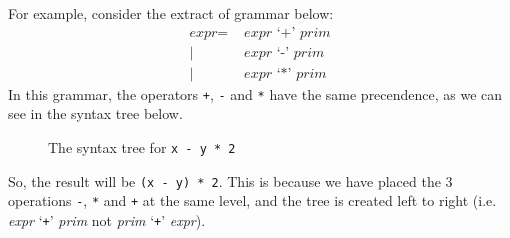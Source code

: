 \documentclass[a4paper, openany]{memoir}
\begin{document}
For example, consider the extract of grammar below:
\begin{align*}
    \textit{expr} =&  \textit{ expr} \text{ `}\texttt{+}\text{' } \textit{prim} \\
    |\hspace{2pt} & \textit{ expr} \text{ `}\texttt{-}\text{' } \textit{prim} \\
    |\hspace{2pt} & \textit{ expr} \text{ `}\texttt{*}\text{' } \textit{prim}
\end{align*}
\noindent In this grammar, the operators \texttt{+}, \texttt{-} and \texttt{*} have the same precendence, as we can see in the syntax tree below.
\begin{figure}[H]
    \centering
    \caption{The syntax tree for \texttt{x - y * 2}}
\end{figure}
\noindent So, the result will be \texttt{(x - y) * 2}. This is because we have placed the 3 operations \texttt{-}, \texttt{*} and \texttt{+} at the same level, and the tree is created left to right (i.e. \textit{expr} `\texttt{+}' \textit{prim} not \textit{prim} `\texttt{+}' \textit{expr}).
\end{document}
